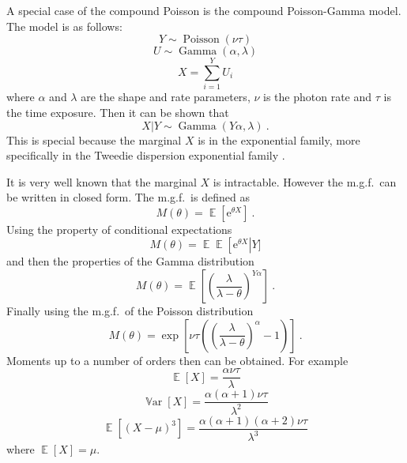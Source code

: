 \documentclass[a4paper]{proc}
\DeclareMathOperator{\expectation}{\mathbb{E}}
\DeclareMathOperator{\variance}{\mathbb{V}ar}
\DeclareMathOperator{\gammaDist}{Gamma}
\DeclareMathOperator{\poisson}{Poisson}
\newcommand{\euler}{\mathrm{e}}
\begin{document}
A special case of the compound Poisson is the compound Poisson-Gamma model. The model is as follows:
\begin{equation}
Y\sim\poisson\left(\nu\tau\right)
\end{equation}
\begin{equation}
U\sim\gammaDist\left(\alpha,\lambda\right)
\end{equation}
\begin{equation}
X = \sum_{i=1}^Y U_i
\end{equation}
where $\alpha$ and $\lambda$ are the shape and rate parameters, $\nu$ is the photon rate and $\tau$ is the time exposure. Then it can be shown that
\begin{equation}
X|Y\sim\gammaDist\left(Y\alpha,\lambda\right) \ .
\end{equation}
This is special because the marginal $X$ is in the exponential family, more specifically in the Tweedie dispersion exponential family \cite{jorgensen1987exponential}.

It is very well known that the marginal $X$ is intractable. However the m.g.f.~can be written in closed form. The m.g.f.~is defined as
\begin{equation}
M(\theta)=\expectation\left[\euler^{\theta X}\right] \ .
\end{equation}
Using the property of conditional expectations
\begin{equation*}
M(\theta)=\expectation\expectation\left[\euler^{\theta X}\right|Y]
\end{equation*}
and then the properties of the Gamma distribution
\begin{equation*}
M(\theta)=\expectation\left[\left(\frac{\lambda}{\lambda-\theta}\right)^{Y\alpha}\right] \ .
\end{equation*}
Finally using the m.g.f.~of the Poisson distribution
\begin{equation}
M(\theta)=\exp\left[\nu\tau\left(\left(\frac{\lambda}{\lambda-\theta}\right)^{\alpha}-1\right)\right] \ .
\end{equation}
Moments up to a number of orders then can be obtained. For example
\begin{equation}
\expectation\left[X\right]=\frac{\alpha\nu\tau}{\lambda}
\end{equation}
\begin{equation}
\variance\left[X\right]=\frac{\alpha(\alpha+1)\nu\tau}{\lambda^2}
\end{equation}
\begin{equation}
\expectation\left[(X-\mu)^3\right] = \frac{\alpha(\alpha+1)(\alpha+2)\nu\tau}{\lambda^3}
\end{equation}
where $\expectation\left[X\right]=\mu$.
\end{document}
